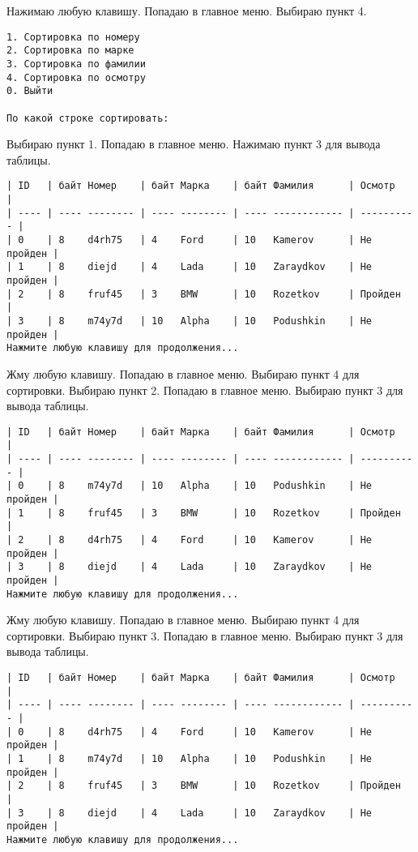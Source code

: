 Нажимаю любую клавишу. Попадаю в главное меню. Выбираю пункт 4.

\begin{tcolorbox}
\begin{verbatim}
1. Сортировка по номеру
2. Сортировка по марке  
3. Сортировка по фамилии
4. Сортировка по осмотру
0. Выйти

По какой строке сортировать: 
\end{verbatim}
\end{tcolorbox}

Выбираю пункт 1. Попадаю в главное меню. Нажимаю пункт 3 для вывода таблицы.

\begin{tcolorbox}
\begin{verbatim}
| ID   | байт Номер    | байт Марка    | байт Фамилия      | Осмотр     |
| ---- | ---- -------- | ---- -------- | ---- ------------ | ---------- |
| 0    | 8    d4rh75   | 4    Ford     | 10   Kamerov      | Не пройден |
| 1    | 8    diejd    | 4    Lada     | 10   Zaraydkov    | Не пройден |
| 2    | 8    fruf45   | 3    BMW      | 10   Rozetkov     | Пройден    |
| 3    | 8    m74y7d   | 10   Alpha    | 10   Podushkin    | Не пройден |
Нажмите любую клавишу для продолжения...
\end{verbatim}
\end{tcolorbox}

Жму любую клавишу. Попадаю в главное меню. Выбираю пункт 4 для сортировки. Выбираю пункт 2. Попадаю в главное меню. Выбираю пункт 3 для вывода таблицы.

\begin{tcolorbox}
\begin{verbatim}
| ID   | байт Номер    | байт Марка    | байт Фамилия      | Осмотр     |
| ---- | ---- -------- | ---- -------- | ---- ------------ | ---------- |
| 0    | 8    m74y7d   | 10   Alpha    | 10   Podushkin    | Не пройден |
| 1    | 8    fruf45   | 3    BMW      | 10   Rozetkov     | Пройден    |
| 2    | 8    d4rh75   | 4    Ford     | 10   Kamerov      | Не пройден |
| 3    | 8    diejd    | 4    Lada     | 10   Zaraydkov    | Не пройден |
Нажмите любую клавишу для продолжения...
\end{verbatim}
\end{tcolorbox}

Жму любую клавишу. Попадаю в главное меню. Выбираю пункт 4 для сортировки. Выбираю пункт 3. Попадаю в главное меню. Выбираю пункт 3 для вывода таблицы.

\begin{tcolorbox}
\begin{verbatim}
| ID   | байт Номер    | байт Марка    | байт Фамилия      | Осмотр     |
| ---- | ---- -------- | ---- -------- | ---- ------------ | ---------- |
| 0    | 8    d4rh75   | 4    Ford     | 10   Kamerov      | Не пройден |
| 1    | 8    m74y7d   | 10   Alpha    | 10   Podushkin    | Не пройден |
| 2    | 8    fruf45   | 3    BMW      | 10   Rozetkov     | Пройден    |
| 3    | 8    diejd    | 4    Lada     | 10   Zaraydkov    | Не пройден |
Нажмите любую клавишу для продолжения...
\end{verbatim}
\end{tcolorbox}

